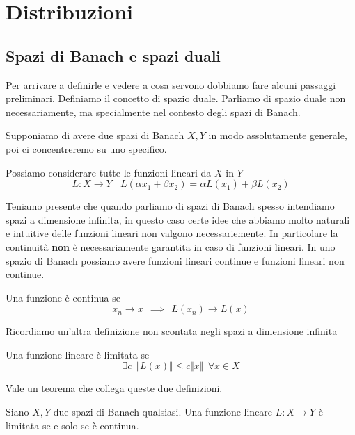 
\chapter{Distribuzioni}

\section{Spazi di Banach e spazi duali}

Per arrivare a definirle e vedere a cosa servono dobbiamo fare alcuni passaggi preliminari. Definiamo il concetto di spazio duale. Parliamo di spazio duale non necessariamente, ma specialmente nel contesto degli spazi di Banach.

Supponiamo di avere due spazi di Banach $X, Y$ in modo assolutamente generale, poi ci concentreremo su uno specifico.
\begin{defn}
[Linearità] Possiamo considerare tutte le funzioni lineari da $X$ in $Y$
\begin{equation*}
L: X\rightarrow Y\ \ \ \ L(\alpha x_{1} + \beta x_{2}) = \alpha L(x_{1}) + \beta L(x_{2})
\end{equation*}
\end{defn}
Teniamo presente che quando parliamo di spazi di Banach spesso intendiamo spazi a dimensione infinita, in questo caso certe idee che abbiamo molto naturali e intuitive delle funzioni lineari non valgono necessariemente. In particolare la continuità \textbf{non} è necessariamente garantita in caso di funzioni lineari. In uno spazio di Banach possiamo avere funzioni lineari continue e funzioni lineari non continue.
\begin{defn}
[Continuità] Una funzione è continua se
\begin{equation*}
x_{n}\rightarrow x\ \ \implies \ \ L(x_{n})\rightarrow L(x)
\end{equation*}
\end{defn}
Ricordiamo un'altra definizione non scontata negli spazi a dimensione infinita
\begin{defn}
[Limitatezza]
Una funzione lineare è limitata se
\begin{equation*}
\exists c\ \ \Vert L(x) \Vert \leq c \Vert x \Vert \ \ \forall x\in X
\end{equation*}
\end{defn}
Vale un teorema che collega queste due definizioni.
\begin{thm}
Siano $X, Y$ due spazi di Banach qualsiasi. Una funzione lineare $L: X\rightarrow Y$ è limitata se e solo se è continua.
\end{thm}
